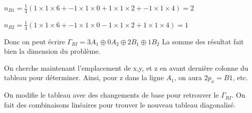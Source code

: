 \documentclass[french]{yLectureNote}
\begin{document}
\(n_{B1} = \frac{1}{4}(1\times1\times 6 + -1\times1\times 0 + 1\times1\times 2 + -1\times1\times 4) = 2\)

\(n_{B2} = \frac{1}{4}(1\times1\times 6 + -1\times1\times 0 - 1\times1\times 2 + 1\times1\times 4) = 1\)

Donc on peut écrire \(\Gamma_{RI} = 3A_1\oplus 0A_2\oplus 2B_1\oplus 1B_2\) La somme des résultat fait bien la dimension du problème.

On cherche maintenant l'emplacement de x,y, et z en avant dernière colonne du tableau pour déterminer. Ainsi, pour z dans la ligne \(A_1\), on aura \(2p_x = B1\), etc.

On modifie le tableau avec des changements de base pour retrouver le \(\Gamma_{RI}\). On fait des combinaisons linéaires pour trouver le nouveau tableau diagonalisé.
 
\end{document}
